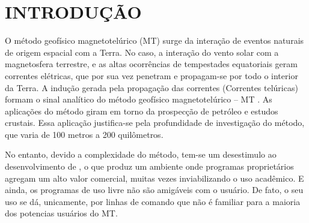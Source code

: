 \setcounter{page}{14}
\chapter{INTRODUÇÃO}
   


    
    
    O método geofísico magnetotelúrico (MT) surge da interação de eventos naturais de origem espacial com a Terra. No caso, a interação do vento solar com a magnetosfera terrestre, e as altas ocorrências de tempestades equatoriais geram correntes elétricas, que por sua vez penetram e propagam-se por todo o interior da Terra. A indução gerada pela propagação das correntes (Correntes telúricas) formam o sinal analítico do método geofísico magnetotelúrico -- MT \cite{parkinson93}. As aplicações do método giram em torno da prospecção de petróleo e estudos crustais. Essa aplicação justifica-se pela profundidade de investigação do método, que varia de 100 metros a 200 quilômetros.

    No entanto, devido a complexidade do método, tem-se um desestimulo ao desenvolvimento de \softwares, o que produz um ambiente onde programas proprietários agregam um alto valor comercial, muitas vezes inviabilizando o uso acadêmico. E ainda, os programas de uso livre não são amigáveis com o usuário. De fato, o seu uso se dá, unicamente, por linhas de comando que não é familiar para a maioria dos potencias usuários do MT.

